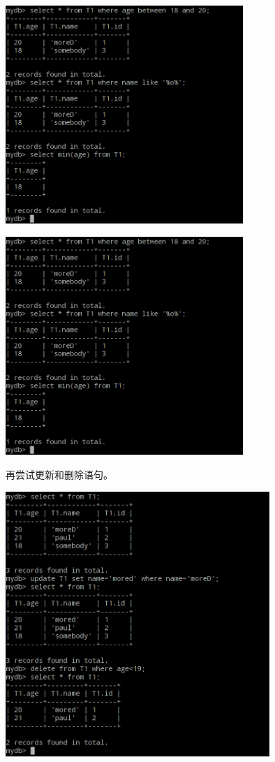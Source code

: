 \documentclass[11pt, a4paper]{article}
\makeatletter
\newcommand\fcaption{\def\@captype{figure}\caption}
\makeatother
\begin{document}
\begin{center}
    \includegraphics[width=9cm]{fig/query2}
    \fcaption{查询2}
\end{center}

\begin{center}
    \includegraphics[width=9cm]{fig/query2}
    \fcaption{查询3}
\end{center}

再尝试更新和删除语句。

\begin{center}
    \includegraphics[width=10cm]{fig/update-delete}
    \fcaption{更新和删除}
\end{center}
\end{document}

